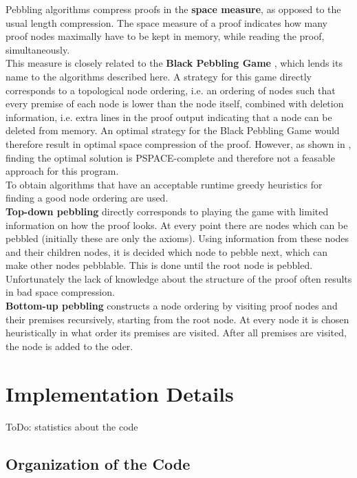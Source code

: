 \documentclass{llncs}
\begin{document}
Pebbling algorithms compress proofs in the \textbf{space measure}, as opposed to the usual length compression. The space measure of a proof indicates how many proof nodes maximally have to be kept in memory, while reading the proof, simultaneously.\\
This measure is closely related to the \textbf{Black Pebbling Game} \cite{gilbert1980pebbling}, which lends its name to the algorithms described here. A strategy for this game directly corresponds to a topological node ordering, i.e. an ordering of nodes such that every premise of each node is lower than the node itself, combined with deletion information, i.e. extra lines in the proof output indicating that a node can be deleted from memory. An optimal strategy for the Black Pebbling Game would therefore result in optimal space compression of the proof. However, as shown in \cite{gilbert1980pebbling}, finding the optimal solution is PSPACE-complete and therefore not a feasable approach for this program.\\
To obtain algorithms that have an acceptable runtime greedy heuristics for finding a good node ordering are used.\\
\textbf{Top-down pebbling} directly corresponds to playing the game with limited information on how the proof looks. At every point there are nodes which can be pebbled (initially these are only the axioms). Using information from these nodes and their children nodes, it is decided which node to pebble next, which can make other nodes pebblable. This is done until the root node is pebbled. Unfortunately the lack of knowledge about the structure of the proof often results in bad space compression.\\
\textbf{Bottom-up pebbling} constructs a node ordering by visiting proof nodes and their premises recursively, starting from the root node. At every node it is chosen heuristically in what order its premises are visited. After all premises are visited, the node is added to the oder.

\section{Implementation Details}

ToDo: statistics about the code

\subsection{Organization of the Code}
\end{document}
